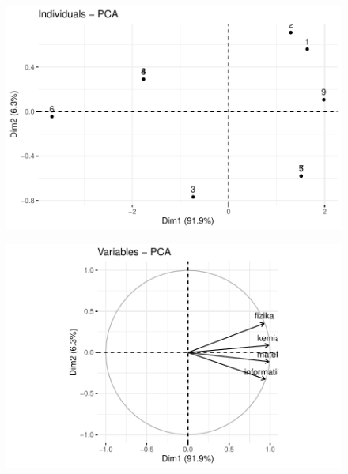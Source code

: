 \documentclass[
  letterpaper,
]{krantz}
\begin{document}
\begin{figure}[H]

{\centering \includegraphics{./sec_fokomponens_elemzes_files/figure-pdf/unnamed-chunk-7-2.pdf}

}

\end{figure}

\begin{figure}[H]

{\centering \includegraphics{./sec_fokomponens_elemzes_files/figure-pdf/unnamed-chunk-7-3.pdf}

}

\end{figure}
\end{document}
